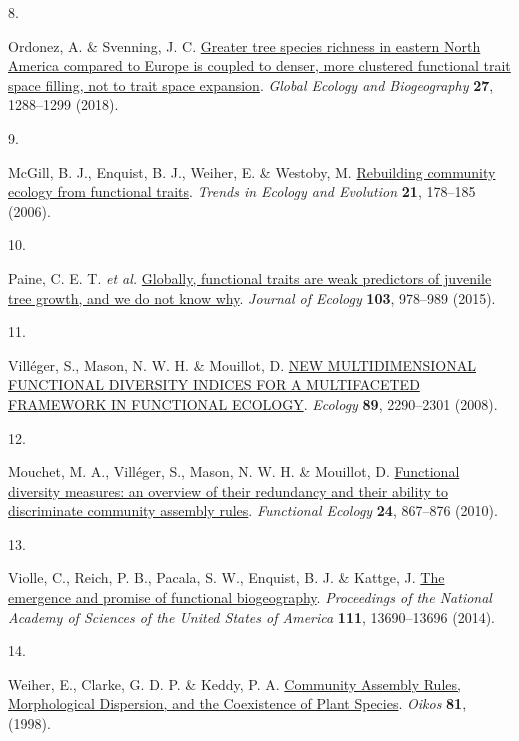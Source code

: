 \documentclass[
  10pt,
]{article}
\newlength{\cslhangindent}
\newlength{\csllabelwidth}
\newlength{\cslentryspacingunit} %
\newenvironment{CSLReferences}[2] %
 {%
  \setlength{\parindent}{0pt}
  \ifodd #1
  \let\oldpar\par
  \def\par{\hangindent=\cslhangindent\oldpar}
  \fi
  \setlength{\parskip}{#2\cslentryspacingunit}
 }%
 {}
\newcommand{\CSLLeftMargin}[1]{\parbox[t]{\csllabelwidth}{#1}}
\newcommand{\CSLRightInline}[1]{\parbox[t]{\linewidth - \csllabelwidth}{#1}\break}
\begin{document}
\begin{CSLReferences}{0}{0}
\leavevmode{}%
\CSLLeftMargin{8. }
\CSLRightInline{Ordonez, A. \& Svenning, J. C. \href{https://doi.org/10.1111/geb.12785}{{Greater tree species richness in eastern North America compared to Europe is coupled to denser, more clustered functional trait space filling, not to trait space expansion}}. \emph{Global Ecology and Biogeography} \textbf{27}, 1288--1299 (2018).}

\leavevmode{}%
\CSLLeftMargin{9. }
\CSLRightInline{McGill, B. J., Enquist, B. J., Weiher, E. \& Westoby, M. \href{https://doi.org/10.1016/J.TREE.2006.02.002}{{Rebuilding community ecology from functional traits}}. \emph{Trends in Ecology and Evolution} \textbf{21}, 178--185 (2006).}

\leavevmode{}%
\CSLLeftMargin{10. }
\CSLRightInline{Paine, C. E. T. \emph{et al.} \href{https://doi.org/10.1111/1365-2745.12401}{{Globally, functional traits are weak predictors of juvenile tree growth, and we do not know why}}. \emph{Journal of Ecology} \textbf{103}, 978--989 (2015).}

\leavevmode{}%
\CSLLeftMargin{11. }
\CSLRightInline{Villéger, S., Mason, N. W. H. \& Mouillot, D. \href{https://doi.org/10.1890/07-1206.1}{{NEW MULTIDIMENSIONAL FUNCTIONAL DIVERSITY INDICES FOR A MULTIFACETED FRAMEWORK IN FUNCTIONAL ECOLOGY}}. \emph{Ecology} \textbf{89}, 2290--2301 (2008).}

\leavevmode{}%
\CSLLeftMargin{12. }
\CSLRightInline{Mouchet, M. A., Villéger, S., Mason, N. W. H. \& Mouillot, D. \href{https://doi.org/10.1111/j.1365-2435.2010.01695.x}{{Functional diversity measures: an overview of their redundancy and their ability to discriminate community assembly rules}}. \emph{Functional Ecology} \textbf{24}, 867--876 (2010).}

\leavevmode{}%
\CSLLeftMargin{13. }
\CSLRightInline{Violle, C., Reich, P. B., Pacala, S. W., Enquist, B. J. \& Kattge, J. \href{https://doi.org/10.1073/pnas.1415442111}{{The emergence and promise of functional biogeography}}. \emph{Proceedings of the National Academy of Sciences of the United States of America} \textbf{111}, 13690--13696 (2014).}

\leavevmode{}%
\CSLLeftMargin{14. }
\CSLRightInline{Weiher, E., Clarke, G. D. P. \& Keddy, P. A. \href{https://doi.org/10.2307/3547051}{{Community Assembly Rules, Morphological Dispersion, and the Coexistence of Plant Species}}. \emph{Oikos} \textbf{81}, (1998).}


\end{CSLReferences}
\end{document}
